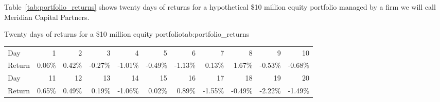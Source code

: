 \documentclass[../ai_in_finance]{subfiles}
\begin{document}
Table~\ref{tab:portfolio_returns} shows twenty days of returns for a hypothetical \$10 million equity portfolio managed by a firm we will call Meridian Capital Partners.

\begin{booktable}[htbp]{Twenty days of returns for a \$10 million equity portfolio}{tab:portfolio_returns}
\begin{tabular}{lrrrrrrrrrr}
\toprule
Day & 1 & 2 & 3 & 4 & 5 & 6 & 7 & 8 & 9 & 10 \\
Return & 0.06\% & 0.42\% & -0.27\% & -1.01\% & -0.49\% & -1.13\% & 0.13\% & 1.67\% & -0.53\% & -0.68\% \\
\midrule
Day & 11 & 12 & 13 & 14 & 15 & 16 & 17 & 18 & 19 & 20 \\
Return & 0.65\% & 0.49\% & 0.19\% & -1.06\% & 0.02\% & 0.89\% & -1.55\% & -0.49\% & -2.22\% & -1.49\% \\
\bottomrule
\end{tabular}
\end{booktable}
\end{document}
